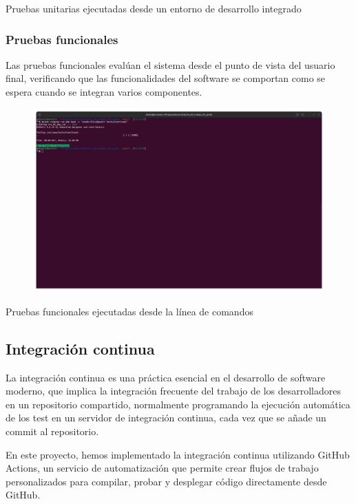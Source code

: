 Pruebas unitarias ejecutadas desde un entorno de desarrollo integrado

\subsubsection*{Pruebas funcionales}
Las pruebas funcionales evalúan el sistema desde el punto de vista del usuario final, verificando que las funcionalidades del software se comportan como se espera cuando se integran varios componentes.

\begin{figure}
    \centering
    \includegraphics{./chapter/4/images/ad_4nxdjm3roncapqpcqzlpzzayuchtishsa3qakfjkye76hnjfezwpd02lbc5ipmjkrhfaqwtwmte-fc_rb67mnqawk_ylrrbdp}
    \caption{}
    \label{fig:ad_4nxdjm3roncapqpcqzlpzzayuchtishsa3qakfjkye76hnjfezwpd02lbc5ipmjkrhfaqwtwmte-fc_rb67mnqawk_ylrrbdp}
\end{figure}

Pruebas funcionales ejecutadas desde la línea de comandos

\subsection*{Integración continua}
La integración continua es una práctica esencial en el desarrollo de software moderno, que implica la integración frecuente del trabajo de los desarrolladores en un repositorio compartido, normalmente programando la ejecución automática de los test en un servidor de integración continua, cada vez que se añade un commit al repositorio.

En este proyecto, hemos implementado la integración continua utilizando GitHub Actions, un servicio de automatización que permite crear flujos de trabajo personalizados para compilar, probar y desplegar código directamente desde GitHub.

